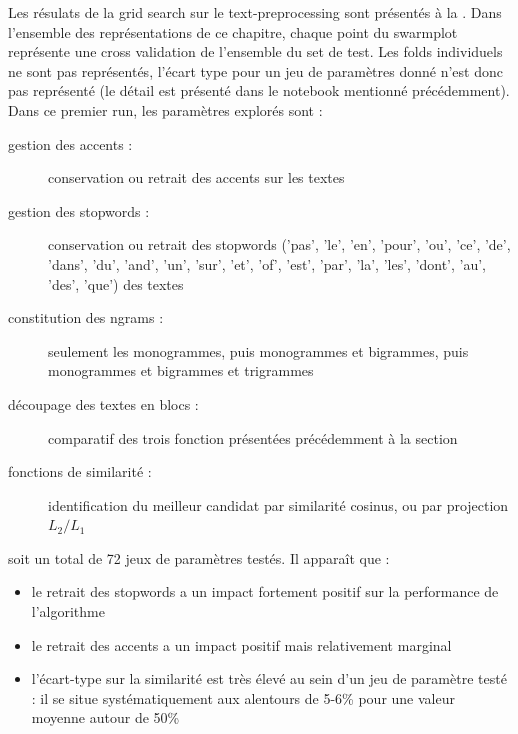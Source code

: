             Les résulats de la grid search sur le text-preprocessing sont présentés à la .
            Dans l'ensemble des représentations de ce chapitre, chaque point du swarmplot représente une cross validation de l'ensemble du set de test.
            Les folds individuels ne sont pas représentés, l'écart type pour un jeu de paramètres donné n'est donc pas représenté (le détail est présenté dans le notebook mentionné précédemment).
            Dans ce premier run, les paramètres explorés sont : 
            \begin{description}
                \item[gestion des accents :] conservation ou retrait des accents sur les textes
                \item[gestion des stopwords :] conservation ou retrait des stopwords ('pas', 'le', 'en', 'pour', 'ou', 'ce', 'de', 'dans', 'du', 'and', 'un', 'sur', 'et', 'of', 'est', 'par', 'la', 'les', 'dont', 'au', 'des', 'que') des textes
                \item[constitution des ngrams :] seulement les monogrammes, puis monogrammes et bigrammes, puis monogrammes et bigrammes et trigrammes
                \item[découpage des textes en blocs :] comparatif des trois fonction présentées précédemment à la section 
                \item[fonctions de similarité :] identification du meilleur candidat par similarité cosinus, ou par projection $L_{2}/L_{1}$
            \end{description}
            soit un total de 72 jeux de paramètres testés.
            Il apparaît que :
            \begin{itemize}
                \item le retrait des stopwords a un impact fortement positif sur la performance de l'algorithme
                \item le retrait des accents a un impact positif mais relativement marginal
                \item l'écart-type sur la similarité est très élevé au sein d'un jeu de paramètre testé : il se situe systématiquement aux alentours de 5-6\% pour une valeur moyenne autour de 50\%
            \end{itemize}


